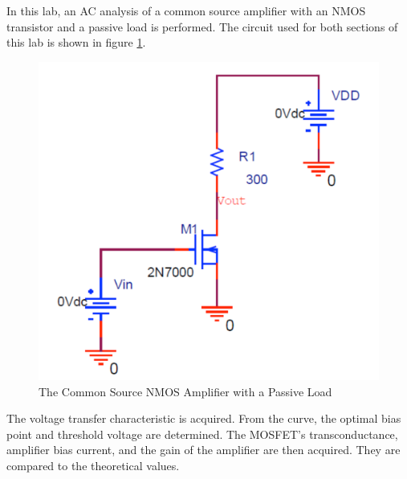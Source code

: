 In this lab, an AC analysis of a common source amplifier with an NMOS transistor and a passive load is performed.
The circuit used for both sections of this lab is shown in figure \ref{fig:circuit}.

\FloatBarrier

\begin{figure}[h!]
	\centering
		\includegraphics[scale=0.75]{./images/circuit.png}
			\caption{The Common Source NMOS Amplifier with a Passive Load}
			\label{fig:circuit}
			\end{figure}

\FloatBarrier

The voltage transfer characteristic is acquired. From the curve, the optimal bias point and threshold voltage are determined. The MOSFET's transconductance, amplifier bias current, and the gain of the amplifier are then acquired. They are compared to the theoretical values.

